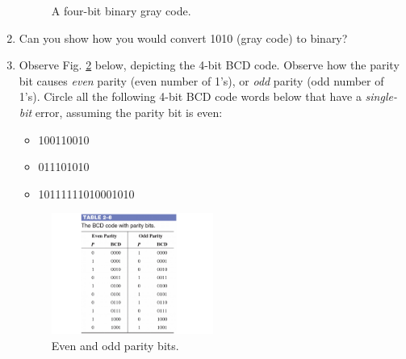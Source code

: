 \documentclass{article}
\begin{document}
\begin{enumerate}
\begin{figure}[hb]
\caption{\label{fig:gray} A four-bit binary gray code.}
\end{figure}
\item Can you show how you would convert 1010 (gray code) to binary? \\ \vspace{0.5cm}
\item Observe Fig. \ref{fig:par} below, depicting the 4-bit BCD code.  Observe how the parity bit causes \textit{even} parity (even number of 1's), or \textit{odd} parity (odd number of 1's).  Circle all the following 4-bit BCD code words below that have a \textit{single-bit} error, assuming the parity bit is even:
\begin{itemize}
\item 100110010
\item 011101010
\item 10111111010001010
\end{itemize}
\begin{figure}[ht]
\centering
\includegraphics[width=0.5\textwidth]{figures/parity.pdf}
\caption{\label{fig:par} Even and odd parity bits.}
\end{figure}
\end{enumerate}
\end{document}
